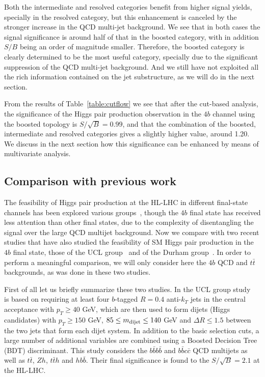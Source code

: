 Both the intermediate and resolved categories benefit from higher signal yields,
specially in the resolved category, but this enhancement is canceled by the stronger
increase in the QCD multi-jet background.
%
We see that in both cases the signal significance is around half of that in the boosted category,
with in addition $S/B$ being an order of magnitude smaller.
%
Therefore, the boosted category is clearly determined to be the most useful category,
specially due to the significant suppression of the QCD multi-jet background.
%
And we still have not exploited all the rich information contained on the jet
substructure, as we will do in the next section.

From the results of Table~\ref{table:cutflow}
we see that after the cut-based analysis, the significance of the Higgs pair production
observation in the $4b$ channel using the boosted topology
is $S/\sqrt{B}=0.99$,
and that the combination
of the boosted, intermediate and resolved categories gives a slightly higher
value, around 1.20.
%
We discuss in the next section how this significance can be enhanced by means
of multivariate analysis.

\subsection{Comparison with previous work}

The feasibility of Higgs pair production at the HL-LHC in different
final-state channels
has been explored various groups~\cite{Baur:2003gp,Barger:2013jfa,
  Baur:2003gpa,Barr:2013tda,Dolan:2013rja,
  Dolan:2012rv,Papaefstathiou:2012qe,Gouzevitch:2013qca,Cooper:2013kia,Wardrope:2014kya,deLima:2014dta}, though
the $4b$ final state has received less attention than other final states,
due to the complexity of disentangling the signal over the large
QCD multijet background.
%
Now we compare with two recent studies that have also studied the
feasibility of SM Higgs pair production in the $4b$ final state,
those of the UCL group~\cite{Wardrope:2014kya} and of the
Durham group~\cite{deLima:2014dta}.
%
In order to perform a meaningful comparison, we will only consider
here the $4b$ QCD and $t\bar{t}$ backgrounds, as was done
in these two studies.

First of all let us briefly summarize these two studies.
%
In the UCL group study~\cite{Wardrope:2014kya} is based
on requiring at least four $b$-tagged $R=0.4$ anti-$k_T$ jets
in the central acceptance with $p_T \ge 40$ GeV, which are
then used to form dijets (Higgs candidates) with
$p_T \ge 150$ GeV, $85 \le m_{\rm dijet} \le 140$ GeV
and $\Delta R \le 1.5$ between the two jets that form
each dijet system.
%
In addition to the basic selection cuts, a large number
of additional variables are combined using a
Boosted Decision Tree (BDT) discriminant.
%
This study considers the $b\bar{b}b\bar{b}$ and
$b\bar{b}c\bar{c}$ QCD multijets as well as
$t\bar{t}$, $Zh$, $t\bar{t}h$ and $hb\bar{b}$.
%
Their final significance is found to the $S/\sqrt{B}=2.1$ at the HL-LHC.

